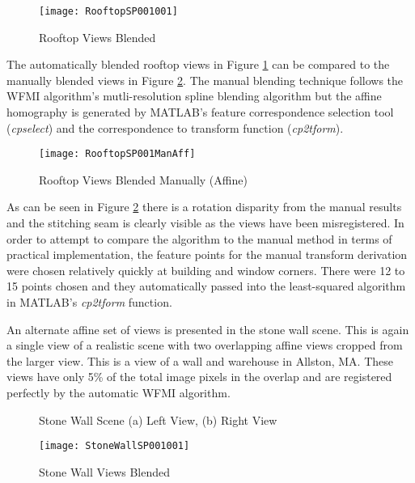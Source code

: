 \begin{figure}[!h]
\label{RooftopStitched}
\centering
\texttt{[image: RooftopSP001001]}
\caption{Rooftop Views Blended}
\end{figure}

The automatically blended rooftop views in Figure \ref{RooftopStitched} can be compared to the manually blended views in Figure \ref{RooftopStitchedManual}. The manual blending technique follows the WFMI algorithm's mutli-resolution spline blending algorithm but the affine homography is generated by MATLAB\textsuperscript{\textregistered}'s feature correspondence selection tool (\textit{cpselect}) and the correspondence to transform function (\textit{cp2tform}).

\begin{figure}[!h]
\label{RooftopStitchedManual}
\centering
\texttt{[image: RooftopSP001ManAff]}
\caption{Rooftop Views Blended Manually (Affine)}
\end{figure}

As can be seen in Figure \ref{RooftopStitchedManual} there is a rotation disparity from the manual results and the stitching seam is clearly visible as the views have been misregistered. In order to attempt to compare the algorithm to the manual method in terms of practical implementation, the feature points for the manual transform derivation were chosen relatively quickly at building and window corners. There were 12 to 15 points chosen and they automatically passed into the least-squared algorithm in MATLAB\textsuperscript{\textregistered}'s \textit{cp2tform} function.

An alternate affine set of views is presented in the stone wall scene. This is again a single view of a realistic scene with two overlapping affine views cropped from the larger view. This is a view of a wall and warehouse in Allston, MA. These views have only 5\% of the total image pixels in the overlap and are registered perfectly by the automatic WFMI algorithm.

\begin{figure}[!h]
\label{StoneWallImages}
\centering
{}
\caption{Stone Wall Scene (a) Left View, (b) Right View}
\end{figure}

\begin{figure}[!h]
\label{StoneWallStitched}
\centering
\texttt{[image: StoneWallSP001001]}
\caption{Stone Wall Views Blended}
\end{figure}



